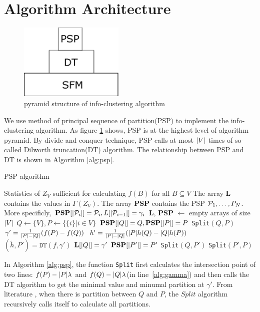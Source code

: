 \documentclass{article}
\begin{document}
\section{Algorithm Architecture}
\begin{figure}[!ht]
\centering
\includegraphics[width=5cm]{pic/pyramid.eps}
\caption{pyramid structure of info-clustering algorithm}\label{fig:ps}
\end{figure}
We use method of principal sequence of partition(PSP) to implement the info-clustering algorithm. As figure \ref{fig:ps} shows, PSP is at the highest level of algorithm pyramid. By divide and conquer technique, PSP calls at most $\abs{V}$ times of so-called Dilworth truncation(DT) algorithm. The relationship between PSP and DT is shown in Algorithm \ref{alg:psp}.
\begin{algorithm}
\caption{PSP algorithm}\label{alg:psp}
\begin{algorithmic}[1]
\REQUIRE Statistics of $Z_V$ sufficient for calculating $f(B)$ for all $B \subseteq V$
\ENSURE The array \textbf{L} contains the values in $\Gamma(Z_V)$. The array \textbf{PSP} contains the PSP $\P_1,\dots, P_N$. More specificly, $\textbf{PSP}[\abs{\P_i}]=\P_i, L[\abs{\P_{i-1}}]=\gamma_i$
\STATE \textbf{L}, \textbf{PSP} $\leftarrow$ empty arrays of size $\abs{V}$
\STATE $Q\leftarrow \{V\}, P \leftarrow \{ \{i \} | i \in V\}$
\STATE $\mathbf{PSP}[\abs{Q}]=Q, \mathbf{PSP}[\abs{P}] = P$
\STATE \texttt{Split}$(Q,P)$
 \STATE\label{alg:gamma} $\gamma' = {1 \over \abs{P} - \abs{Q}} (f(P)-f(Q))$
 \STATE $h' = {1 \over \abs{P} - \abs{Q}}(\abs{P} h(Q) - \abs{Q} h(P))$
 \STATE $(\tilde{h}, P') = \texttt{DT}(f,\gamma')$
 	\STATE $\mathbf{L}[\abs{Q}] = \gamma'$
 \ELSE
 	\STATE $\mathbf{PSP}[\abs{P'}]=P'$
 	\STATE \texttt{Split}$(Q,P')$
 	\STATE \texttt{Split}$(P',P)$
 \ENDIF
\ENDFUNCTION
\end{algorithmic}
\end{algorithm}

In Algorithm \ref{alg:psp}, the function \texttt{Split} first calculates the intersection point of two lines: $f(P)-\abs{P}\lambda$ and $f(Q)-\abs{Q}\lambda$(in line~\ref{alg:gamma}) and then calls the DT algorithm to get the minimal value and minumal partition at $\gamma'$. From literature \cite{mac}, when there is partition between $Q$ and $P$, the $Split$ algorithm recursively calls itself to calculate all partitions.
\end{document}
